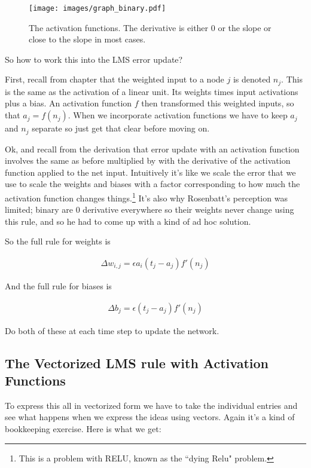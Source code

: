 \begin{figure}[h]
\centering
\texttt{[image: images/graph\_binary.pdf]}
\caption[Jeff Yoshimi.]{The activation functions. The derivative is either 0 or the slope or close to the slope in most cases. }
\label{derivativesActFunctions}
\end{figure}

So how to work this into the LMS error update?

First, recall from chapter  that the weighted input to a node $j$ is denoted $n_j$. This is the same as the activation of a linear unit. Its weights times input activations plus a bias. An activation function $f$ then transformed this weighted inputs, so that $a_j = f(n_j)$. When we incorporate activation functions we have to keep $a_j$ and $n_j$ separate so just get that clear before moving on.

Ok, and recall from the derivation that error update with an activation function involves the same as before multiplied by with the derivative of the activation function applied to the net input. Intuitively it's like we scale the error that we use to scale the weights and biases with a factor corresponding to how much the activation function changes things.\footnote{This is a problem with RELU, known as the ``dying Relu" problem.}  It's also why Rosenbatt's perception was limited; binary are 0 derivative everywhere so their weights never change using this rule, and so he had to come up with a kind of ad hoc solution.

So the full rule for weights is

\begin{eqnarray*}
\Delta w_{i,j}  =  \epsilon a_i (t_j - a_j) f' (n_j)
\end{eqnarray*}

And the full rule for biases is 

\begin{eqnarray*}
\Delta b_{j}  =  \epsilon (t_j - a_j) f' (n_j)
\end{eqnarray*}

Do both of these at each time step to update the network.

\subsection{The Vectorized LMS rule with Activation Functions}

To express this all in vectorized form we have to take the individual entries and see what happens when we express the ideas using vectors.  Again it's a kind of bookkeeping exercise. Here is what we get:

